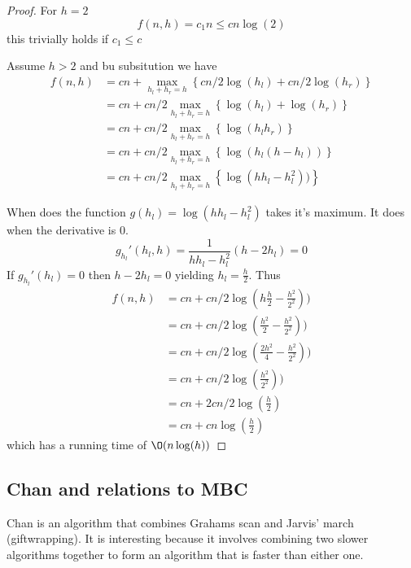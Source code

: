 \documentclass[10pt]{article}
\begin{document}
\begin{proof}

  For $h=2$                
  \begin{equation}
    f(n,h) = c_1n \leq cn\log(2)
  \end{equation}
  this trivially holds if $c_1 \leq c$
  
  Assume $h>2$ and bu subsitution we have
  \begin{align*}
   f(n,h) &= cn + \max_{h_l+h_r = h}\left\{cn/2\log(h_l)+cn/2\log(h_r)\right\} \\
          &= cn + cn/2\max_{h_l+h_r = h}\left\{\log(h_l)+\log(h_r)\right\} \\
          &= cn + cn/2\max_{h_l+h_r = h}\left\{\log(h_lh_r)\right\} \\          
          &= cn + cn/2\max_{h_l+h_r = h}\left\{\log(h_l(h-h_l))\right\} \\         
          &= cn + cn/2\max_{h_l+h_r = h}\left\{\log(hh_l-h_l^2))\right\}                    
  \end{align*}
    
  When does the function $g(h_l) = \log(hh_l-h_l^2)$ takes it's maximum. It does when the derivative is $0$.
  \begin{equation}
    g_{h_l}'(h_l,h) = \frac{1}{hh_l-h_l^2} (h-2h_l) = 0 
  \end{equation}
  If $g_{h_l}'(h_l)=0$ then $h-2h_l=0$ yielding $h_l = \frac{h}{2}$. Thus
  \begin{align*}
   f(n,h) &= cn + cn/2\log(h\frac{h}{2}-\frac{h^2}{2^2})) \\
          &= cn + cn/2\log(\frac{h^2}{2}-\frac{h^2}{2^2})) \\   
          &= cn + cn/2\log(\frac{2h^2}{4}-\frac{h^2}{2^2})) \\
          &= cn + cn/2\log(\frac{h^2}{2^2})) \\                       
          &= cn + 2cn/2\log(\frac{h}{2}) \\                                 
          &= cn + cn\log(\frac{h}{2})                                 
  \end{align*}
   which has a running time of $\O(n\log(h))$
   
\end{proof}



\subsection{Chan and relations to MBC} %
\label{sub:chan_and_relations_to_mbc}
Chan is an algorithm that combines Grahams scan and Jarvis' march (giftwrapping). It is interesting because it involves combining two slower algorithms together to form an algorithm that is faster than either one.
\end{document}
